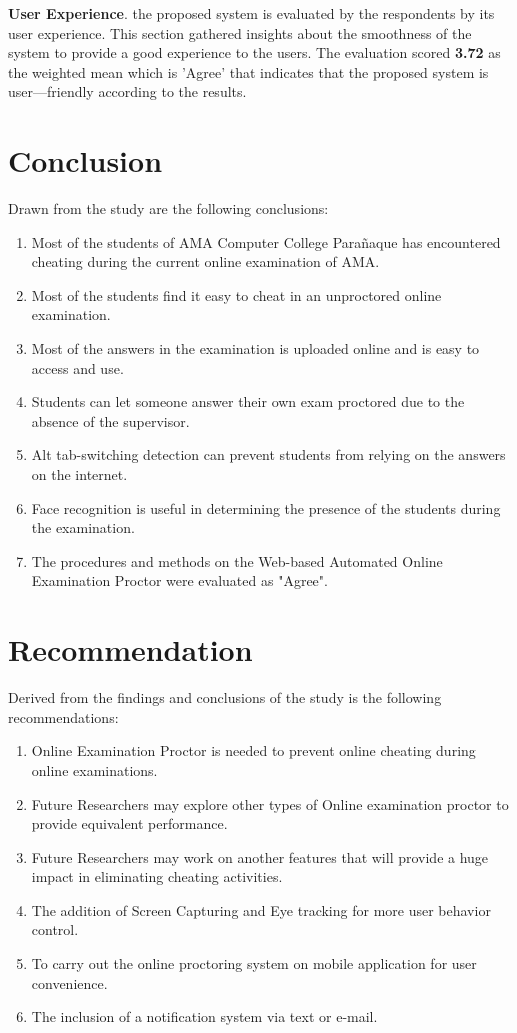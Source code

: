 \textbf{User Experience}.
the proposed system is evaluated by the respondents by its user experience.
This section gathered insights about the smoothness of the system to provide a good experience to the users.
The evaluation scored \textbf{3.72} as the weighted mean which is 'Agree' that indicates that the proposed system is user—friendly according to the results.

\section{Conclusion}

Drawn from the study are the following conclusions:

\begin{enumerate}
   \item Most of the students of AMA Computer College Parañaque has encountered cheating during the current online examination of AMA.
   \item Most of the students find it easy to cheat in an unproctored online examination.
   \item Most of the answers in the examination is uploaded online and is easy to access and use.
   \item Students can let someone answer their own exam proctored due to the absence of the supervisor.
   \item Alt tab-switching detection can prevent students from relying on the answers on the internet.
   \item Face recognition is useful in determining the presence of the students during the examination.
   \item The procedures and methods on the Web-based Automated Online Examination Proctor were evaluated as "Agree".
\end{enumerate}

\section{Recommendation}

Derived from the findings and conclusions of the study is the following recommendations:

\begin{enumerate}
   \item Online Examination Proctor is needed to prevent online cheating during online examinations.
   \item Future Researchers may explore other types of Online examination proctor to provide equivalent performance.
   \item Future Researchers may work on another features that will provide a huge impact in eliminating cheating activities.
   \item The addition of Screen Capturing and Eye tracking for more user behavior control.
   \item To carry out the online proctoring system on mobile application for user convenience.
   \item The inclusion of a notification system via text or e-mail.
\end{enumerate}
